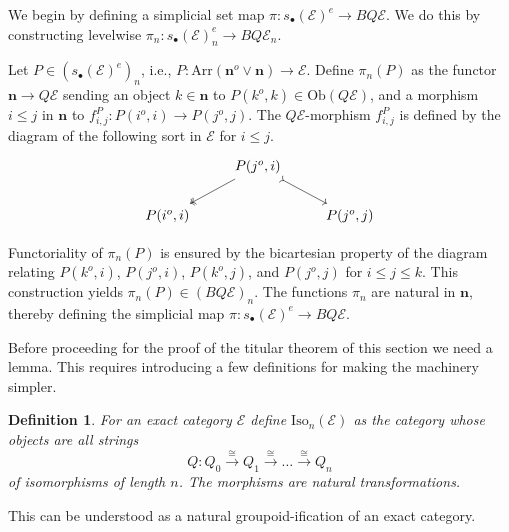 \documentclass[12pt]{report}
\numberwithin{equation}{section}
\newtheorem{definition}[dummy]{Definition}
\begin{document}
	We begin by defining a simplicial set map \( \pi: s_\bullet(\mathcal{E})^e \to BQ\mathcal{E} \). We do this by constructing levelwise \( \pi_n: s_\bullet(\mathcal{E})^e_n \to BQ \mathcal{E}_n \).
	
	Let $P \in (s_\bullet(\mathcal{E})^e)_n$, i.e., $P \colon \mathrm{Arr}(\mathbf{n}^o \vee \mathbf{n}) \to \mathcal{E}$. Define $\pi_n(P)$ as the functor $\mathbf{n} \to Q\mathcal{E}$ sending an object $k \in \mathbf{n}$ to $P(k^o,k) \in \mathrm{Ob}(Q\mathcal{E})$, and a morphism $i \le j$ in $\mathbf{n}$ to $f^P_{i,j} \colon P(i^o,i) \to P(j^o,j)$. The $Q\mathcal{E}$-morphism $f^P_{i,j}$ is defined by the diagram of the following sort in $\mathcal{E}$ for \( i \leq j \).  \[\begin{tikzcd}
		& {P(j^o,i)} \\
		{P(i^o,i)} && {P(j^o,j)}
		\arrow[two heads, from=1-2, to=2-1]
		\arrow[tail, from=1-2, to=2-3]
	\end{tikzcd}\] 
	
	
	Functoriality of $\pi_n(P)$ is ensured by the bicartesian property of the diagram relating $P(k^o,i)$, $P(j^o,i)$, $P(k^o,j)$, and $P(j^o,j)$ for $i \le j \le k$. This construction yields $\pi_n(P) \in (BQ\mathcal{E})_n$. The functions $\pi_n$ are natural in $\mathbf{n}$, thereby defining the simplicial map $\pi \colon s_\bullet(\mathcal{E})^e \to BQ\mathcal{E}$.
	
	
	Before proceeding for the proof of the titular theorem of this section we need a lemma. This requires introducing a few definitions for making the machinery simpler.
	
	\begin{definition}
		For an exact category \( \mathcal{E} \) define $\mathrm{Iso}_n(\mathcal{E})$ as the category whose objects are all strings
		\[ Q \colon Q_0 \xrightarrow{\cong} Q_1 \xrightarrow{\cong} \dots \xrightarrow{\cong} Q_n \]
		of isomorphisms of length $n$. The morphisms are natural transformations.
	\end{definition}
	
	This can be understood as a natural groupoid-ification of an exact category.
	
\end{document}
